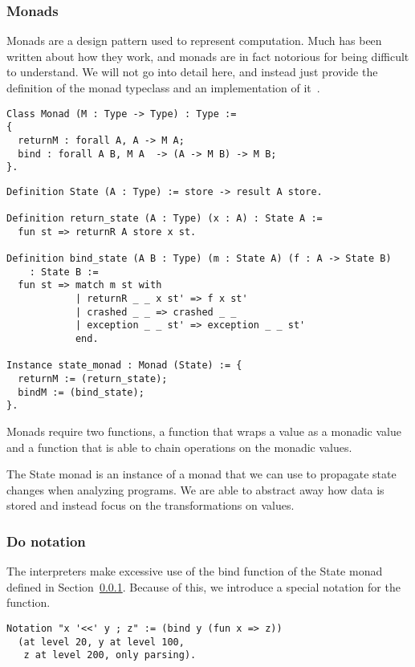 \subsubsection{Monads}\label{sec:monad}
Monads are a design pattern used to represent computation. Much has been
written about how they work, and monads are in fact notorious for being
difficult to understand. We will not go into detail here, and instead just 
provide the definition of the monad typeclass and an implementation of
it~\cite{kleisli1965every}.

\begin{verbatim}
Class Monad (M : Type -> Type) : Type :=
{
  returnM : forall A, A -> M A;
  bind : forall A B, M A  -> (A -> M B) -> M B;
}.
\end{verbatim}

\begin{verbatim}
Definition State (A : Type) := store -> result A store.

Definition return_state (A : Type) (x : A) : State A :=
  fun st => returnR A store x st.

Definition bind_state (A B : Type) (m : State A) (f : A -> State B) 
    : State B :=
  fun st => match m st with
            | returnR _ _ x st' => f x st'
            | crashed _ _ => crashed _ _
            | exception _ _ st' => exception _ _ st'
            end.

Instance state_monad : Monad (State) := {
  returnM := (return_state);
  bindM := (bind_state);
}.
\end{verbatim}

Monads require two functions, a  function that wraps a value as a
monadic value and a  function that is able to chain operations on the
monadic values. 

The State monad is an instance of a monad that we can use to propagate state
changes when analyzing programs. We are able to abstract away how data is
stored and instead focus on the transformations on values.

\subsubsection{Do notation}
The interpreters make excessive use of the bind function of the State monad
defined in Section~\ref{sec:monad}. Because of this, we introduce a special
notation for the function.

\begin{verbatim}
Notation "x '<<' y ; z" := (bind y (fun x => z))
  (at level 20, y at level 100, 
   z at level 200, only parsing).
\end{verbatim}

